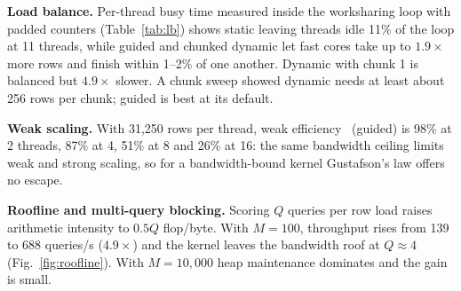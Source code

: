 \documentclass[conference,a4paper]{IEEEtran}
\begin{document}
\textbf{Load balance.} Per-thread busy time measured inside the worksharing loop with padded counters
(Table~\ref{tab:lb}) shows static leaving threads idle 11\% of the loop at 11 threads, while guided and chunked
dynamic let fast cores take up to $1.9\times$ more rows and finish within 1--2\% of one another. Dynamic with chunk 1
is balanced but $4.9\times$ slower. A chunk sweep showed dynamic needs at least about 256 rows per chunk; guided is
best at its default.

\begin{table}[!t]
\caption{Kernel 1 load balance at 11 threads, $N=500{,}000$}
\label{tab:lb}
\centering\footnotesize
\setlength{\tabcolsep}{3.5pt}
\end{table}

\textbf{Weak scaling.} With 31,250 rows per thread, weak efficiency~\cite{gustafson} (guided) is 98\% at 2 threads,
87\% at 4, 51\% at 8 and 26\% at 16: the same bandwidth ceiling limits weak and strong scaling, so for a
bandwidth-bound kernel Gustafson's law offers no escape.

\textbf{Roofline and multi-query blocking.} Scoring $Q$ queries per row load raises arithmetic intensity to $0.5Q$
flop/byte. With $M=100$, throughput rises from 139 to 688 queries/s ($4.9\times$) and the kernel leaves the bandwidth
roof at $Q\approx4$ (Fig.~\ref{fig:roofline}). With $M=10{,}000$ heap maintenance dominates and the gain is small.
\end{document}

